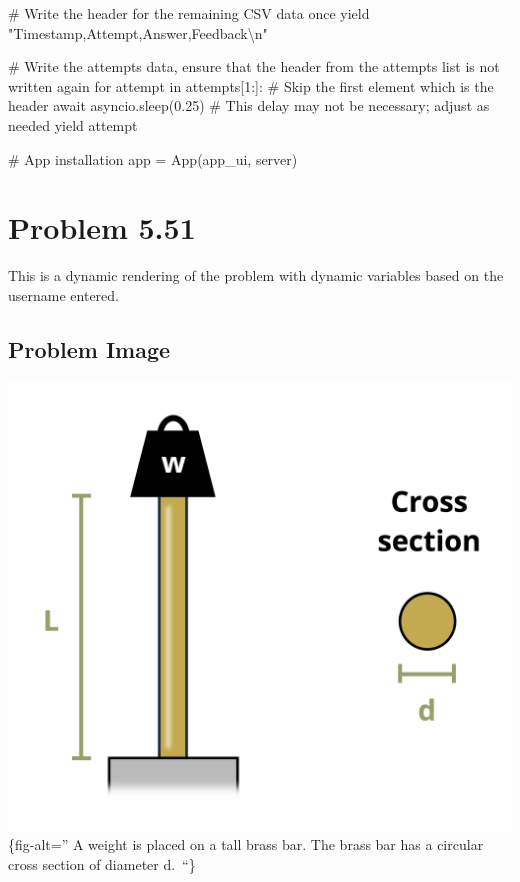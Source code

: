 \documentclass[
  letterpaper,
  DIV=11,
  numbers=noendperiod]{scrreprt}
\newenvironment{Shaded}{\begin{snugshade}}{\end{snugshade}}
\newcommand{\NormalTok}[1]{\textcolor[rgb]{0.00,0.23,0.31}{#1}}
\begin{document}
\begin{Shaded}
\begin{Highlighting}[]
\NormalTok{        \# Write the header for the remaining CSV data once}
\NormalTok{        yield "Timestamp,Attempt,Answer,Feedback\textbackslash{}n"}
        
\NormalTok{        \# Write the attempts data, ensure that the header from the attempts list is not written again}
\NormalTok{        for attempt in attempts[1:]:  \# Skip the first element which is the header}
\NormalTok{            await asyncio.sleep(0.25)  \# This delay may not be necessary; adjust as needed}
\NormalTok{            yield attempt}


\NormalTok{\# App installation}
\NormalTok{app = App(app\_ui, server)}
\end{Highlighting}
\end{Shaded}

\chapter*{Problem 5.51}\label{problem-5.51}


This is a dynamic rendering of the problem with dynamic variables based
on the username entered.

\section*{Problem Image}\label{problem-image-30}


\includegraphics{images/223.png}\{fig-alt='' A weight is placed on a
tall brass bar. The brass bar has a circular cross section of diameter
d.~``\}
\end{document}
